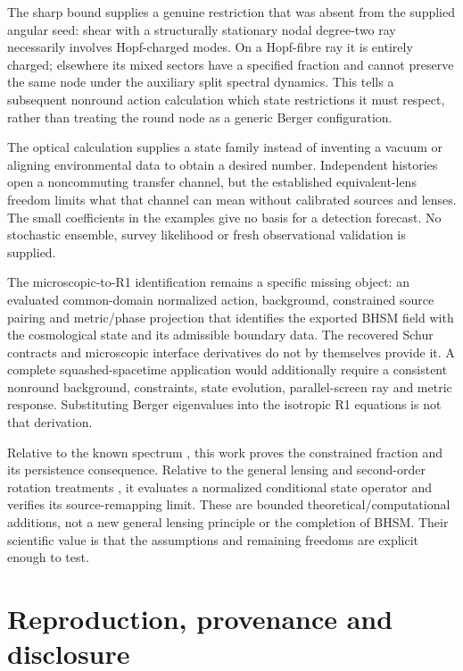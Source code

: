 \documentclass[11pt,a4paper]{article}
\begin{document}
The sharp bound supplies a genuine restriction that was absent from
the supplied angular seed: shear with a structurally stationary nodal
degree-two ray necessarily involves Hopf-charged modes. On a Hopf-fibre
ray it is entirely charged; elsewhere its mixed sectors have a specified
fraction and cannot preserve the same node under the auxiliary split
spectral dynamics. This tells a subsequent nonround action calculation
which state restrictions it must respect, rather than treating the
round node as a generic Berger configuration.

The optical calculation supplies a state family instead of inventing a
vacuum or aligning environmental data to obtain a desired number.
Independent histories open a noncommuting transfer channel, but the
established equivalent-lens freedom limits what that channel can mean
without calibrated sources and lenses. The small coefficients in the
examples give no basis for a detection forecast. No stochastic ensemble,
survey likelihood or fresh observational validation is supplied.

The microscopic-to-R1 identification remains a specific missing object:
an evaluated common-domain normalized action, background, constrained
source pairing and metric/phase projection that identifies the exported
BHSM field with the cosmological state and its admissible boundary data.
The recovered Schur contracts and microscopic interface derivatives do
not by themselves provide it. A complete squashed-spacetime application
would additionally require a consistent nonround background, constraints,
state evolution, parallel-screen ray and metric response. Substituting
Berger eigenvalues into the isotropic R1 equations is not that derivation.

Relative to the known spectrum \cite{Lauret2019Berger}, this work proves
the constrained fraction and its persistence consequence. Relative to
the general lensing and second-order rotation treatments
\cite{Fleury2021Arbitrary,Magi2026Rotation}, it evaluates a normalized
conditional state operator and verifies its source-remapping limit.
These are bounded theoretical/computational additions, not a new general
lensing principle or the completion of BHSM. Their scientific value is
that the assumptions and remaining freedoms are explicit enough to test.

\appendix


\section{Reproduction, provenance and disclosure}
\end{document}
